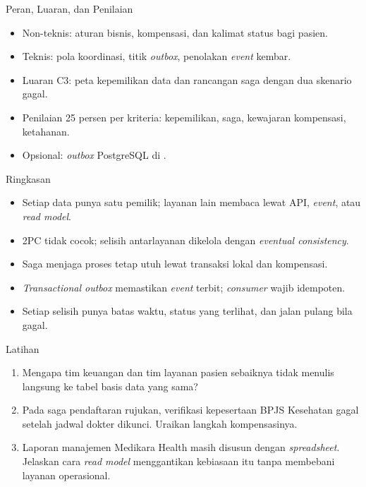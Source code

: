 \documentclass[aspectratio=169, table, 12pt]{beamer}
\begin{document}
\begin{frame}{{\Large Peran, Luaran, dan Penilaian}}
  \vspace{6pt}
  \small
  \begin{itemize}
    \item Non-teknis: aturan bisnis, kompensasi, dan kalimat status bagi pasien.
    \item Teknis: pola koordinasi, titik \textit{outbox}, penolakan
          \textit{event} kembar.
    \item Luaran C3: peta kepemilikan data dan rancangan saga dengan dua
          skenario gagal.
    \item Penilaian 25 persen per kriteria: kepemilikan, saga, kewajaran
          kompensasi, ketahanan.
    \item Opsional: \textit{outbox} PostgreSQL di
          .
  \end{itemize}
\end{frame}

\begin{frame}{{\Large Ringkasan}}
  \vspace{6pt}
  \small
  \begin{itemize}
    \item Setiap data punya satu pemilik; layanan lain membaca lewat API,
          \textit{event}, atau \textit{read model}.
    \item 2PC tidak cocok; selisih antarlayanan dikelola dengan
          \textit{eventual consistency}.
    \item Saga menjaga proses tetap utuh lewat transaksi lokal dan kompensasi.
    \item \textit{Transactional outbox} memastikan \textit{event} terbit;
          \textit{consumer} wajib idempoten.
    \item Setiap selisih punya batas waktu, status yang terlihat, dan jalan
          pulang bila gagal.
  \end{itemize}
\end{frame}

\begin{frame}{{\Large Latihan}}
  \vspace{6pt}
  \small
  \begin{enumerate}
    \item Mengapa tim keuangan dan tim layanan pasien sebaiknya tidak menulis
          langsung ke tabel basis data yang sama?
    \item Pada saga pendaftaran rujukan, verifikasi kepesertaan BPJS Kesehatan
          gagal setelah jadwal dokter dikunci. Uraikan langkah kompensasinya.
    \item Laporan manajemen Medikara Health masih disusun dengan
          \textit{spreadsheet}. Jelaskan cara \textit{read model} menggantikan
          kebiasaan itu tanpa membebani layanan operasional.
  \end{enumerate}
\end{frame}
\end{document}
